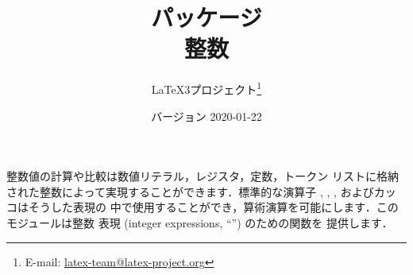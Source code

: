 \documentclass[dvipdfmx,full,kernel]{wtpl3doc}
\begin{document}
\title{パッケージ \\ 整数}
%
\author{%
 \LaTeX3プロジェクト\thanks
   {%
     E-mail:
       \href{mailto:latex-team@latex-project.org}
         {latex-team@latex-project.org}%
   }%
}
%
\date{バージョン 2020-01-22}
%
\maketitle
%
\begin{documentation}
%
整数値の計算や比較は数値リテラル，レジスタ，定数，トークン
リストに格納された整数によって実現することができます．標準的な演算子
\code{+}, \code{-}, \code{/}, \code{*}およびカッコはそうした表現の
中で使用することができ，算術演算を可能にします．このモジュールは整数
表現 (integer expressions, \enquote{}) のための関数を
提供します．
%

\end{documentation}
\end{document}
